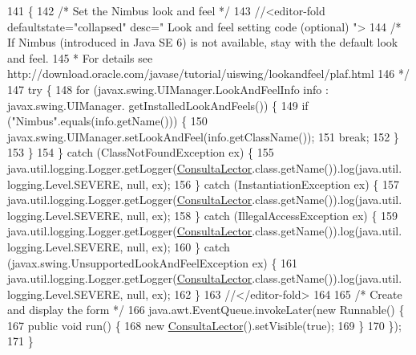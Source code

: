 \begin{DoxyCode}
141                                            \{
142         \textcolor{comment}{/* Set the Nimbus look and feel */}
143         \textcolor{comment}{//<editor-fold defaultstate="collapsed" desc=" Look and feel setting code (optional) ">}
144         \textcolor{comment}{/* If Nimbus (introduced in Java SE 6) is not available, stay with the default look and feel.}
145 \textcolor{comment}{         * For details see http://download.oracle.com/javase/tutorial/uiswing/lookandfeel/plaf.html }
146 \textcolor{comment}{         */}
147         \textcolor{keywordflow}{try} \{
148             \textcolor{keywordflow}{for} (javax.swing.UIManager.LookAndFeelInfo info : javax.swing.UIManager.
      getInstalledLookAndFeels()) \{
149                 \textcolor{keywordflow}{if} (\textcolor{stringliteral}{"Nimbus"}.equals(info.getName())) \{
150                     javax.swing.UIManager.setLookAndFeel(info.getClassName());
151                     \textcolor{keywordflow}{break};
152                 \}
153             \}
154         \} \textcolor{keywordflow}{catch} (ClassNotFoundException ex) \{
155             java.util.logging.Logger.getLogger(\mbox{\hyperlink{class_interfaz_package_1_1_consulta_lector_aada092751d0db60c4a1b6fcde682d30b}{ConsultaLector}}.class.getName()).log(java.util.
      logging.Level.SEVERE, null, ex);
156         \} \textcolor{keywordflow}{catch} (InstantiationException ex) \{
157             java.util.logging.Logger.getLogger(\mbox{\hyperlink{class_interfaz_package_1_1_consulta_lector_aada092751d0db60c4a1b6fcde682d30b}{ConsultaLector}}.class.getName()).log(java.util.
      logging.Level.SEVERE, null, ex);
158         \} \textcolor{keywordflow}{catch} (IllegalAccessException ex) \{
159             java.util.logging.Logger.getLogger(\mbox{\hyperlink{class_interfaz_package_1_1_consulta_lector_aada092751d0db60c4a1b6fcde682d30b}{ConsultaLector}}.class.getName()).log(java.util.
      logging.Level.SEVERE, null, ex);
160         \} \textcolor{keywordflow}{catch} (javax.swing.UnsupportedLookAndFeelException ex) \{
161             java.util.logging.Logger.getLogger(\mbox{\hyperlink{class_interfaz_package_1_1_consulta_lector_aada092751d0db60c4a1b6fcde682d30b}{ConsultaLector}}.class.getName()).log(java.util.
      logging.Level.SEVERE, null, ex);
162         \}
163         \textcolor{comment}{//</editor-fold>}
164 
165         \textcolor{comment}{/* Create and display the form */}
166         java.awt.EventQueue.invokeLater(\textcolor{keyword}{new} Runnable() \{
167             \textcolor{keyword}{public} \textcolor{keywordtype}{void} run() \{
168                 \textcolor{keyword}{new} \mbox{\hyperlink{class_interfaz_package_1_1_consulta_lector_aada092751d0db60c4a1b6fcde682d30b}{ConsultaLector}}().setVisible(\textcolor{keyword}{true});
169             \}
170         \});
171     \}
\end{DoxyCode}


